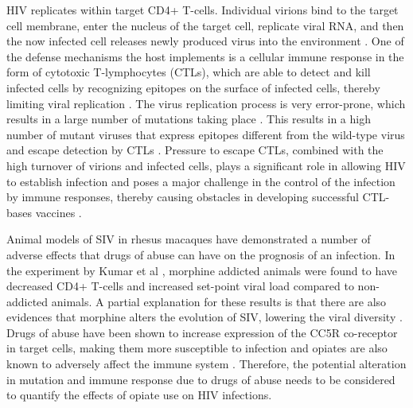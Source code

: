 \documentclass[11pt, oneside]{article}    %
\begin{document}
\vspace{5mm}
	
	HIV replicates within target CD4+ T-cells. Individual virions bind to the target cell membrane, enter the nucleus of the target cell, replicate viral RNA, and then the now infected cell releases newly produced virus into the environment \cite{Kitchen,Killeen, Chan}. One of the defense mechanisms the host implements is a cellular immune response in the form of cytotoxic T-lymphocytes (CTLs), which are able to detect and kill infected cells by recognizing epitopes on the surface of infected cells, thereby limiting viral replication \cite{ Greenough, Ganusov2013}. The virus replication process is very error-prone, which results in a large number of mutations taking place \cite{Klein}. This results in a high number of mutant viruses that express epitopes different from the wild-type virus and escape detection by CTLs \cite{Klein, Fryer, Chan}. Pressure to escape CTLs, combined with the high turnover of virions and infected cells, plays a significant role in allowing HIV to establish infection \cite{Boutwell,McMichael,Ribeiro} and poses a major challenge in the control of the infection by immune responses, thereby causing obstacles in developing successful CTL-bases vaccines \cite{Deng, Konrad, Barouch}. 

\vspace{5mm}

	Animal models of SIV in rhesus macaques have demonstrated a number of adverse effects that drugs of abuse can have on the prognosis of an infection. In the experiment by Kumar et al \cite{Kumar}, morphine addicted animals were found to have decreased CD4+ T-cells and increased set-point viral load compared to non-addicted animals. A partial explanation for these results is that there are also evidences that morphine alters the evolution of SIV, lowering the viral diversity \cite{ Noel2006, Noel2007, Rivera-Amill}. Drugs of abuse have been shown to increase expression of the CC5R co-receptor in target cells, making them more susceptible to infection \cite{Kumar, Miyagi, Li} and opiates are also known to adversely affect the immune system \cite{Rivera-Amill}. Therefore, the potential alteration in mutation and immune response due to drugs of abuse needs to be considered to quantify the effects of opiate use on HIV infections.

\vspace{5mm}
\end{document}
